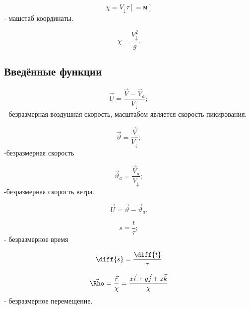 $$\chi = V_\downarrow \tau [=\mbox{м}]$$ 
- машстаб координаты.

$$\chi = \frac{V_\downarrow^2}{g}.$$


\subsection{Введённые функции}

$$\vec{U} = \frac{\vec{V}-\vec{V}_a}{V_\downarrow};$$
- безразмерная воздушная скорость, масштабом является скорость пикирования.

$$\vec{\vartheta} = \frac{\vec{V}}{V_\downarrow};$$
-безразмерная скорость

$$\vec{\vartheta}_a = \frac{\vec{V}_a}{V_\downarrow};$$
-безразмерная скорость ветра.

$$\vec{U} = \vec{\vartheta} - \vec{\vartheta}_a.$$

$$s = \frac{t}{\tau};$$
- безразмерное время

$$\diff{s} = \frac{\diff{t}}{\tau}$$

$$\vec{\Rho} = \frac{\vec{r}}{\chi} = \frac{x\vec{i}+y\vec{j}+z\vec{k}}{\chi}$$
- безразмерное перемещение.
